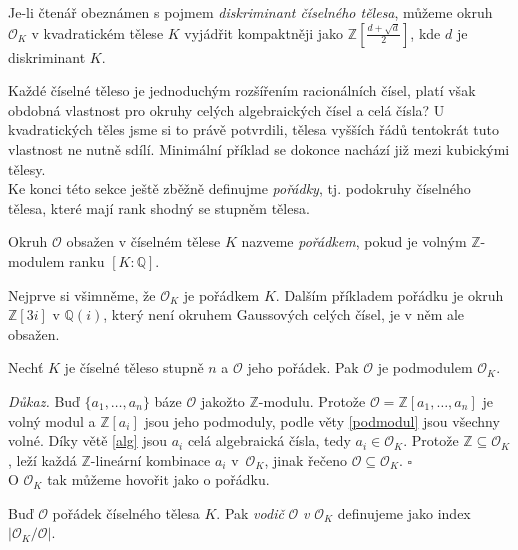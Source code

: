 \documentclass [12pt]{report}
\begin{document}
\begin{poznamka}
Je-li čtenář obeznámen s pojmem \textit{diskriminant číselného tělesa}, můžeme okruh $\mathcal{O}_K$ v kvadratickém tělese $K$ vyjádřit kompaktněji jako  $\mathbb{Z}\left[\frac{d+\sqrt{d}}{2}\right]$, kde $d$ je diskriminant $K$.
\end{poznamka}

Každé číselné těleso je jednoduchým rozšířením racionálních čísel, platí však obdobná vlastnost pro okruhy celých algebraických čísel a celá čísla? U kvadratických těles jsme si to právě potvrdili, tělesa vyšších řádů tentokrát tuto vlastnost ne nutně sdílí. Minimální příklad se dokonce nachází již mezi kubickými tělesy.\\

Ke konci této sekce ještě zběžně definujme \textit{pořádky}, tj. podokruhy číselného tělesa, které mají rank shodný se stupněm tělesa.

\begin{definice}
Okruh $\mathcal{O}$ obsažen v číselném tělese $K$ nazveme \textit{pořádkem}, pokud je volným $\mathbb{Z}$-modulem ranku $[K:\mathbb{Q}]$.
\end{definice}

Nejprve si všimněme, že $\mathcal{O}_K$ je pořádkem $K$. Dalším příkladem pořádku je okruh $\mathbb{Z}[3i]$ v $\mathbb{Q}(i)$, který není okruhem Gaussových celých čísel, je v něm ale obsažen.


\begin{veta}\label{podporadek}
Nechť $K$ je číselné těleso stupně $n$ a $\mathcal{O}$ jeho pořádek. Pak $\mathcal{O}$ je podmodulem $\mathcal{O}_K$.
\end{veta}

\noindent \textit{Důkaz.} Buď $\lbrace a_1, \dots,a_n \rbrace$ báze $\mathcal{O}$ jakožto $\mathbb{Z}$-modulu. Protože $\mathcal{O} = \mathbb{Z}[a_1,\dots,a_n]$ je volný modul a $\mathbb{Z}[a_i]$ jsou jeho podmoduly, podle věty \ref{podmodul} jsou všechny volné. Díky větě \ref{alg} jsou $a_i$ celá algebraická čísla, tedy $a_i \in \mathcal{O}_K$. Protože $\mathbb{Z} \subseteq \mathcal{O}_K$, leží každá $\mathbb{Z}$-lineární kombinace $a_i$ v~$\mathcal{O}_K$, jinak řečeno $\mathcal{O} \subseteq \mathcal{O}_K$. \hfill $\square$\\

O $\mathcal{O}_K$ tak můžeme hovořit jako o  pořádku.

\begin{definice}
Buď $\mathcal{O}$ pořádek číselného tělesa $K$. Pak \textit{vodič} $\mathcal{O}$ \textit{v} $\mathcal{O}_K$ definujeme jako index $\vert \mathcal{O}_K / \mathcal{O}\vert$.
\end{definice}
\end{document}
